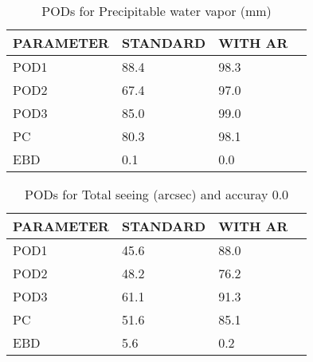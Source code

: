 \documentclass[11pt,english]{article}
\begin{document}
\begin{table}[]
\begin{center}
\begin{tabular}{|l|l|l|l|}
\hline
\multicolumn{1}{|c|}{\cellcolor[HTML]{C0C0C0}\textbf{PARAMETER}} & \multicolumn{1}{c|}{\cellcolor[HTML]{C0C0C0}\textbf{STANDARD}} & \multicolumn{1}{c|}{\cellcolor[HTML]{C0C0C0}\textbf{WITH AR}} \\
\hline
\cellcolor[HTML]{C0C0C0}POD1  & 88.4                                & 98.3         \\
\cellcolor[HTML]{C0C0C0}POD2  & 67.4                                & 97.0         \\
\cellcolor[HTML]{C0C0C0}POD3  & 85.0                                & 99.0         \\
\cellcolor[HTML]{C0C0C0}PC    & 80.3                                  & 98.1           \\
\cellcolor[HTML]{C0C0C0}EBD   & 0.1                                 & 0.0          \\
\hline
\end{tabular}
\caption{PODs for Precipitable water vapor (mm)}
\end{center}
\end{table}
\begin{table}[]
\begin{center}
\begin{tabular}{|l|l|l|l|}
\hline
\multicolumn{1}{|c|}{\cellcolor[HTML]{C0C0C0}\textbf{PARAMETER}} & \multicolumn{1}{c|}{\cellcolor[HTML]{C0C0C0}\textbf{STANDARD}} & \multicolumn{1}{c|}{\cellcolor[HTML]{C0C0C0}\textbf{WITH AR}} \\
\hline
\cellcolor[HTML]{C0C0C0}POD1  & 45.6                                & 88.0         \\
\cellcolor[HTML]{C0C0C0}POD2  & 48.2                                & 76.2         \\
\cellcolor[HTML]{C0C0C0}POD3  & 61.1                                & 91.3         \\
\cellcolor[HTML]{C0C0C0}PC    & 51.6                                  & 85.1           \\
\cellcolor[HTML]{C0C0C0}EBD   & 5.6                                 & 0.2          \\
\hline
\end{tabular}
\caption{PODs for Total seeing (arcsec) and accuray 0.0}
\end{center}
\end{table}
\end{document}
